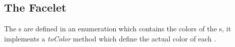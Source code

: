 \subsection{The Facelet}
The \facelet{}s are defined in an enumeration which contains the colors of the \facelet{}s, it implements a \textit{toColor} method which define the actual color of each \facelet{}.